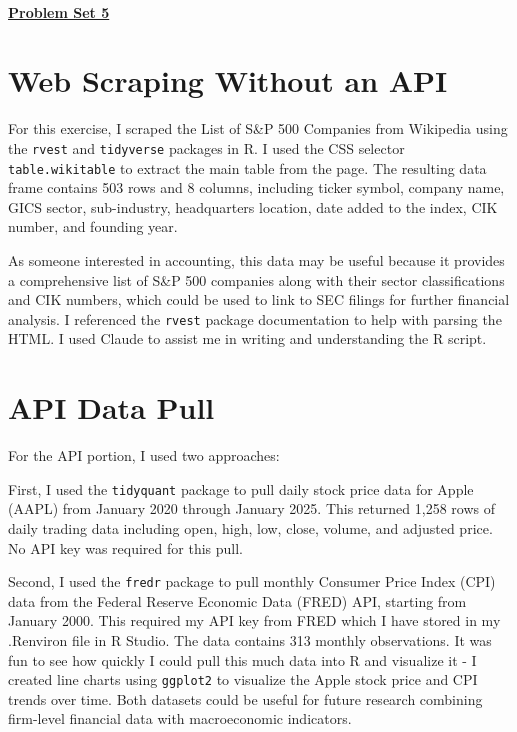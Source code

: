 \documentclass{article}
\begin{document}
~
\vspace{2em}
\begin{center}
\textbf{\Large \underline{Problem Set 5}}
\end{center}

\vspace{1em}

\section{Web Scraping Without an API}

For this exercise, I scraped the List of S\&P 500 Companies from Wikipedia using the \texttt{rvest} and \texttt{tidyverse} packages in R. I used the CSS selector \texttt{table.wikitable} to extract the main table from the page. The resulting data frame contains 503 rows and 8 columns, including ticker symbol, company name, GICS sector, sub-industry, headquarters location, date added to the index, CIK number, and founding year.

As someone interested in accounting, this data may be useful because it provides a comprehensive list of S\&P 500 companies along with their sector classifications and CIK numbers, which could be used to link to SEC filings for further financial analysis. I referenced the \texttt{rvest} package documentation to help with parsing the HTML. I used Claude to assist me in writing and understanding the R script. 

\section{API Data Pull}

For the API portion, I used two approaches: 

First, I used the \texttt{tidyquant} package to pull daily stock price data for Apple (AAPL) from January 2020 through January 2025. This returned 1,258 rows of daily trading data including open, high, low, close, volume, and adjusted price. No API key was required for this pull.

Second, I used the \texttt{fredr} package to pull monthly Consumer Price Index (CPI) data from the Federal Reserve Economic Data (FRED) API, starting from January 2000. This required my API key from FRED which I have stored in my .Renviron file in R Studio. The data contains 313 monthly observations. It was fun to see how quickly I could pull this much data into R and visualize it - I created line charts using \texttt{ggplot2} to visualize the Apple stock price and CPI trends over time. Both datasets could be useful for future research combining firm-level financial data with macroeconomic indicators. 
\end{document}
